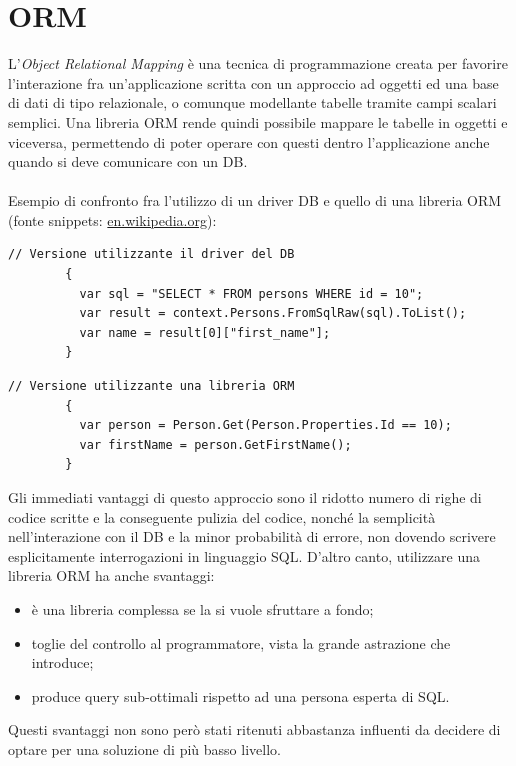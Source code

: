 \documentclass[a4paper, 12pt]{report}
\begin{document}
    \section{ORM}
      L'\emph{Object Relational Mapping} è una tecnica di programmazione creata per favorire l'interazione fra un'applicazione scritta con un approccio ad oggetti ed una base di dati di tipo relazionale, o comunque modellante tabelle tramite campi scalari semplici.
      Una libreria ORM rende quindi possibile mappare le tabelle in oggetti e viceversa, permettendo di poter operare con questi dentro l'applicazione anche quando si deve comunicare con un DB.
    \paragraph*{}
      Esempio di confronto fra l'utilizzo di un driver DB e quello di una libreria ORM (fonte snippets: \href{https://en.wikipedia.org/wiki/Object%E2%80%93relational_mapping}{en.wikipedia.org}):
      \begin{Verbatim}[samepage=true]
        // Versione utilizzante il driver del DB
        {
          var sql = "SELECT * FROM persons WHERE id = 10";
          var result = context.Persons.FromSqlRaw(sql).ToList();
          var name = result[0]["first_name"];
        }
      \end{Verbatim}
      \begin{Verbatim}[samepage=true]
        // Versione utilizzante una libreria ORM
        {
          var person = Person.Get(Person.Properties.Id == 10);
          var firstName = person.GetFirstName();
        }
      \end{Verbatim}
      Gli immediati vantaggi di questo approccio sono il ridotto numero di righe di codice scritte e la conseguente pulizia del codice, nonché la semplicità nell'interazione con il DB e la minor probabilità di errore, non dovendo scrivere esplicitamente interrogazioni in linguaggio SQL.
      D'altro canto, utilizzare una libreria ORM ha anche svantaggi:
      \begin{itemize}
        \item è una libreria complessa se la si vuole sfruttare a fondo;
        \item toglie del controllo al programmatore, vista la grande astrazione che introduce;
        \item produce query sub-ottimali rispetto ad una persona esperta di SQL.
      \end{itemize}
      Questi svantaggi non sono però stati ritenuti abbastanza influenti da decidere di optare per una soluzione di più basso livello.
\end{document}
